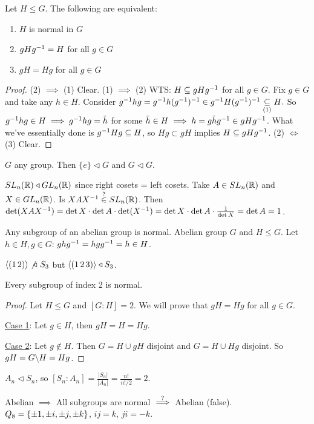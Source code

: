 \documentclass[]{article}
\begin{document}
\begin{theorem}
	Let $H\leq G$. The following are equivalent:
	\begin{enumerate}
		\item $H$ is normal in $G$
		\item $gHg^{-1} = H$ for all $g\in G$
		\item $gH = Hg$ for all $g\in G$
	\end{enumerate}
\end{theorem}
\begin{proof}
	(2) $\implies$ (1) Clear.
	(1) $\implies$ (2) WTS: $H \subseteq gHg^{-1}$ for all $g\in G$. Fix $g\in G$ and take any $h\in H$.
	Consider 
	$g^{-1} hg = g^{-1} h(g^{-1})^{-1} \in g^{-1} H(g^{-1})^{-1} \underset{(1)}{\subseteq} H.$
	So $g^{-1} hg \in H \implies g^{-1} hg = \tilde h$ for some $\tilde h\in H \implies h = g\tilde h g^{-1}\in gHg^{-1}$.
	What we've essentially done is $g^{-1} Hg \subseteq H$, so $Hg \subset gH$ implies $H\subseteq gHg^{-1}$.
	(2) $\iff$ (3) Clear.
\end{proof}
\begin{example}
	$G$ any group. Then $\{e\} \triangleleft G$ and $G\triangleleft G$.
\end{example}
\begin{example}
	$SL_n(\mathbb{R}) \triangleleft GL_n(\mathbb{R})$ since right cosets = left cosets.
	Take $A\in SL_n(\mathbb{R})$ and $X\in GL_n(\mathbb{R})$. Is $XAX^{-1} \overset{?}{\in} SL_n(\mathbb{R})$. 
	Then $\det(XAX^{-1}) = \det X\cdot \det A\cdot \det(X^{-1}) = \det X\cdot \det A \cdot \frac{1}{\det X} = \det A = 1$.
\end{example}
\begin{example}
	Any subgroup of an abelian group is normal. Abelian group $G$ and $H\leq G$. Let $h\in H,g\in G$: $ghg^{-1} = hgg^{-1} = h\in H$.
\end{example}
\begin{example}
	$\gen{(1\,2)} \not\triangleleft\ S_3$ but $\langle (1\,2\,3) \rangle \triangleleft S_3$.
\end{example}

\begin{theorem}
	Every subgroup of index 2 is normal.
\end{theorem}
\begin{proof}
	Let $H\leq G$ and $[G:H] = 2$. We will prove that $gH = Hg$ for all $g\in G$.

	\ul{Case 1}: Let $g\in H$, then $gH = H = Hg$.

	\ul{Case 2}: Let $g\notin H$. Then $G = H\cup gH$ disjoint and $G = H\cup Hg$ disjoint. So $gH = G\backslash H = Hg$.
\end{proof}
\begin{example}
	$A_n \triangleleft S_n$, so $[S_n:A_n] = \frac{|S_n|}{|A_n|} = \frac{n!}{n!/2} = 2$.
\end{example}
Abelian $\implies$ All subgroups are normal $\overset{?}{\implies}$ Abelian (false). $Q_8 = \left\{ \pm 1,\pm i,\pm j, \pm k \right\}$, $ij = k$, $ji = -k$.
\end{document}
